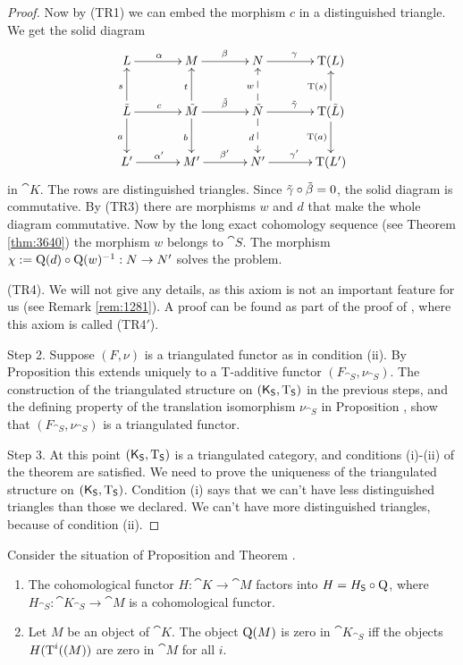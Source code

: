 \begin{proof}
Now by (TR1) we can embed the morphism $c$ in a distinguished
triangle. We get the solid diagram
\begin{equation} \label{eqn:106}
\UseTips \xymatrix @C=8ex @R=5.5ex { 
L 
\ar[r]^{\al}
&
M
\ar[r]^{\be}
& 
N
\ar[r]^{\ga}
&
\opn{T}(L)
\\
\til{L} 
\ar[r]^{c}
\ar[d]_{a}
\ar[u]^{s}
&
\til{M}
\ar[r]^{\til{\be}}
\ar[d]_{b}
\ar[u]^{t}
& 
\til{N}
\ar[r]^{\til{\ga}}
\ar@{-->}[d]_{d}
\ar@{-->}[u]^{w}
&
\opn{T}(\til{L})
\ar[d]_{\opn{T}(a)}
\ar[u]^{\opn{T}(s)}
\\
L' 
\ar[r]^{\al'}
&
M'
\ar[r]^{\be'}
& 
N'
\ar[r]^{\ga'}
&
\opn{T}(L') 
} 
\end{equation}
in $\cat{K}$. The rows are distinguished triangles. 
Since $\tilde{\gamma} \circ \tilde{\beta} = 0$, the solid diagram is commutative.  
By (TR3) there are morphisms $w$ and $d$ that make the whole diagram
commutative. 
Now by the long exact cohomology sequence (see Theorem \ref{thm:3640})
the morphism $w$ belongs to $\cat{S}$. The morphism 
$\chi := \operatorname{Q}(d) \circ \operatorname{Q}(w)^{-1} :  N \to N'$
solves the problem.

\medskip \noindent 
(TR4). We will not give any details, as this axiom is not an important feature 
for us (see Remark \ref{rem:1281}).  A proof can be found as part of the proof 
of \cite[Theorem 2.1.8, page 97]{Ne1}, where this axiom is called (TR4$'$). 

\medskip \noindent
Step 2. Suppose $(F, \nu)$ is a triangulated functor as in condition (ii).
By Proposition \tup{\ref{prop:1841}} this extends uniquely to a 
T-additive functor $(F_{\cat{S}}, \nu_{\cat{S}})$. 
The construction of the triangulated structure on 
$(\operatorname{\mathsf{K}}_{\operatorname{\mathsf{S}}}, \operatorname{T}_{\operatorname{\mathsf{S}}})$ in the previous steps,
and the defining property of the translation isomorphism $\nu_{\cat{S}}$ in 
Proposition \tup{\ref{prop:1841}}, show that
$(F_{\cat{S}}, \nu_{\cat{S}})$ is a triangulated functor. 

\medskip \noindent
Step 3. At this point $(\operatorname{\mathsf{K}}_{\operatorname{\mathsf{S}}}, \operatorname{T}_{\operatorname{\mathsf{S}}})$ 
is a triangulated category, and conditions (i)-(ii) of the theorem are 
satisfied. We need to prove the uniqueness of the triangulated structure on
$(\operatorname{\mathsf{K}}_{\operatorname{\mathsf{S}}}, \operatorname{T}_{\operatorname{\mathsf{S}}})$. Condition (i) says that we can't have 
less distinguished triangles than those we declared. We can't have more
distinguished triangles, because of condition (ii). 
\end{proof}

\begin{prop} \label{prop:1410}
Consider the situation of Proposition \tup{\ref{prop:106}} and Theorem 
\tup{\ref{thm:105}}. 
\begin{enumerate}
\item The cohomological functor 
$H : \cat{K} \to \cat{M}$ factors into 
$H = H_{\operatorname{\mathsf{S}}} \circ \operatorname{Q}$, where 
$H_{\cat{S}} : \cat{K}_{\cat{S}} \to \cat{M}$ is a cohomological functor.

\item Let $M$ be an object of $\cat{K}$. The object $\operatorname{Q}(M)$ is zero 
in $\cat{K}_{\cat{S}}$ iff the objects $H(\operatorname{T}^i((M))$ are zero in $\cat{M}$ 
for all $i$. 
\end{enumerate}
\end{prop}

